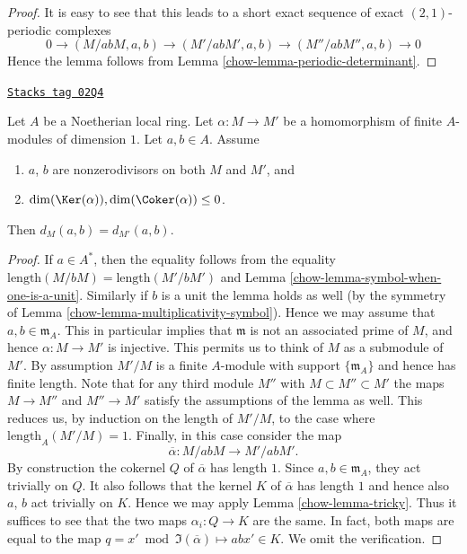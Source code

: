 \begin{proof}

It is easy to see that this leads to a short exact sequence
of exact $(2, 1)$-periodic complexes
$$
0 \to
(M/abM, a, b) \to
(M'/abM', a, b) \to
(M''/abM'', a, b) \to 0
$$
Hence the lemma follows from Lemma \ref{chow-lemma-periodic-determinant}.
\end{proof}

\begin{lemma}
\label{chow-lemma-symbol-compare-modules}
\href{https://stacks.math.columbia.edu/tag/02Q4}{\texttt{Stacks tag 02Q4}}

Let $A$ be a Noetherian local ring.
Let $\alpha : M \to M'$ be a homomorphism of
finite $A$-modules of dimension $1$.
Let $a, b \in A$. Assume
\begin{enumerate}
\item $a$, $b$ are nonzerodivisors on both $M$ and $M'$, and
\item $\dim(\Ker(\alpha)), \dim(\Coker(\alpha)) \leq 0$.
\end{enumerate}
Then $d_M(a, b) = d_{M'}(a, b)$.
\end{lemma}

\begin{proof}

If $a \in A^*$, then the equality follows from the
equality $\text{length}(M/bM) = \text{length}(M'/bM')$
and Lemma \ref{chow-lemma-symbol-when-one-is-a-unit}.
Similarly if $b$ is a unit the lemma holds as well
(by the symmetry of Lemma \ref{chow-lemma-multiplicativity-symbol}).
Hence we may assume that $a, b \in \mathfrak m_A$.
This in particular implies that $\mathfrak m$ is not
an associated prime of $M$, and hence $\alpha : M \to M'$
is injective. This permits us to think of $M$ as a submodule of $M'$.
By assumption $M'/M$ is a finite $A$-module with support
$\{\mathfrak m_A\}$ and hence has finite length.
Note that for any third module $M''$ with $M \subset M'' \subset M'$
the maps $M \to M''$ and $M'' \to M'$ satisfy the assumptions of the lemma
as well. This reduces us, by induction on the length of $M'/M$,
to the case where $\text{length}_A(M'/M) = 1$.
Finally, in this case consider the map
$$
\overline{\alpha} : M/abM \longrightarrow M'/abM'.
$$
By construction the cokernel $Q$ of $\overline{\alpha}$ has
length $1$. Since $a, b \in \mathfrak m_A$, they act trivially on
$Q$. It also follows that the kernel $K$ of $\overline{\alpha}$ has
length $1$ and hence also $a$, $b$ act trivially on $K$.
Hence we may apply Lemma \ref{chow-lemma-tricky}. Thus it suffices to see
that the two maps $\alpha_i : Q \to K$ are the same.
In fact, both maps are equal to the map
$q = x' \bmod \Im(\overline{\alpha}) \mapsto abx' \in K$.
We omit the verification.
\end{proof}


